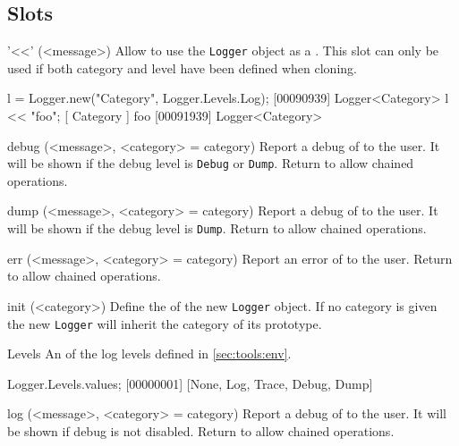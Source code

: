 \subsection{Slots}

\begin{urbiscriptapi}

\item['<<'](<message>)%
  Allow to use the \lstinline|Logger| object as a . This
  slot can only be used if both category and level have been defined when
  cloning.

\begin{urbiscript}
l = Logger.new("Category", Logger.Levels.Log);
[00090939] Logger<Category>
l << "foo";
[       Category        ] foo
[00091939] Logger<Category>
\end{urbiscript}

\item[debug](<message>, <category> = category)%
  Report a debug  of  to the user. It will be
  shown if the debug level is \lstinline|Debug| or \lstinline|Dump|. Return
  \this to allow chained operations.

\item[dump](<message>, <category> = category)%
  Report a debug  of  to the user. It will be
  shown if the debug level is \lstinline|Dump|. Return \this to allow
  chained operations.

\item[err](<message>, <category> = category)%
  Report an error  of  to the user. Return \this
  to allow chained operations.

\item[init](<category>)%
  Define the  of the new \lstinline|Logger| object. If no
  category is given the new \lstinline|Logger| will inherit the category of
  its prototype.

\item[Levels]%
  An  of the log levels defined in
  \autoref{sec:tools:env}.

\begin{urbiscript}
Logger.Levels.values;
[00000001] [None, Log, Trace, Debug, Dump]
\end{urbiscript}

\item[log](<message>, <category> = category)%
  Report a debug  of  to the user. It will be
  shown if debug is not disabled. Return \this to allow chained operations.


\end{urbiscriptapi}

